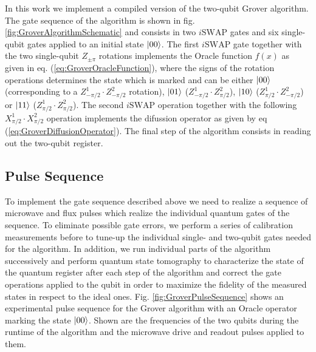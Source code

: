 In this work we implement a compiled version of the two-qubit Grover algorithm. The gate sequence of the algorithm is shown in fig. \ref{fig:GroverAlgorithmSchematic} and consists in two $i\mathrm{SWAP}$ gates and six single-qubit gates applied to an initial state $\left| 00 \right>$. The first $i\mathrm{SWAP}$ gate together with the two single-qubit $Z_{\pm \pi}$ rotations implements the Oracle function $f(x)$ as given in eq. (\ref{eq:GroverOracleFunction}), where the signs of the rotation operations determines the state which is marked and can be either $\left| 00 \right>$ (corresponding to a $Z^1_{-\pi/2}\cdot Z^2_{-\pi/2}$ rotation), $\left| 01 \right>$ ($Z^1_{-\pi/2}\cdot Z^2_{\pi/2}$), $\left| 10 \right>$ ($Z^1_{\pi/2}\cdot Z^2_{-\pi/2}$) or $\left| 11 \right>$ ($Z^1_{\pi/2}\cdot Z^2_{\pi/2}$). The second $i\mathrm{SWAP}$ operation together with the following $X^1_{\pi/2}\cdot X^2_{\pi/2}$ operation implements the difussion operator as given by eq (\ref{eq:GroverDiffusionOperator}). The final step of the algorithm consists in reading out the two-qubit register.

\subsection{Pulse Sequence}

To implement the gate sequence described above we need to realize a sequence of microwave and flux pulses which realize the individual quantum gates of the sequence. To eliminate possible gate errors, we perform a series of calibration measurements before to tune-up the individual single- and two-qubit gates needed for the algorithm. In addition, we run individual parts of the algorithm successively and perform quantum state tomography to characterize the state of the quantum register after each step of the algorithm and correct the gate operations applied to the qubit in order to maximize the fidelity of the measured states in respect to the ideal ones. Fig. \ref{fig:GroverPulseSequence} shows an experimental pulse sequence for the Grover algorithm with an Oracle operator marking the state $\left| 00 \right>$. Shown are the frequencies of the two qubits during the runtime of the algorithm and the microwave drive and readout pulses applied to them.

